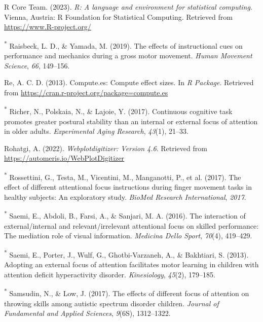 \documentclass[
  man, donotrepeattitle,floatsintext]{apa7}
\newlength{\cslhangindent}
\newlength{\cslentryspacingunit} %
\newenvironment{CSLReferences}[2] %
 {%
  \setlength{\parindent}{0pt}
  \ifodd #1
  \let\oldpar\par
  \def\par{\hangindent=\cslhangindent\oldpar}
  \fi
  \setlength{\parskip}{#2\cslentryspacingunit}
 }%
 {}
\begin{document}
\begin{CSLReferences}{1}{0}
\leavevmode{}%
R Core Team. (2023). \emph{R: A language and environment for statistical computing}. Vienna, Austria: R Foundation for Statistical Computing. Retrieved from \url{https://www.R-project.org/}

\leavevmode{}%
\textsuperscript{*} Raisbeck, L. D., \& Yamada, M. (2019). The effects of instructional cues on performance and mechanics during a gross motor movement. \emph{Human Movement Science}, \emph{66}, 149--156.

\leavevmode{}%
Re, A. C. D. (2013). Compute.es: Compute effect sizes. In \emph{R Package}. Retrieved from \url{https://cran.r-project.org/package=compute.es}

\leavevmode{}%
\textsuperscript{*} Richer, N., Polskaia, N., \& Lajoie, Y. (2017). Continuous cognitive task promotes greater postural stability than an internal or external focus of attention in older adults. \emph{Experimental Aging Research}, \emph{43}(1), 21--33.

\leavevmode{}%
Rohatgi, A. (2022). \emph{Webplotdigitizer: Version 4.6}. Retrieved from \url{https://automeris.io/WebPlotDigitizer}

\leavevmode{}%
\textsuperscript{*} Rossettini, G., Testa, M., Vicentini, M., Manganotti, P., et al. (2017). The effect of different attentional focus instructions during finger movement tasks in healthy subjects: An exploratory study. \emph{BioMed Research International}, \emph{2017}.

\leavevmode{}%
\textsuperscript{*} Saemi, E., Abdoli, B., Farsi, A., \& Sanjari, M. A. (2016). The interaction of external/internal and relevant/irrelevant attentional focus on skilled performance: The mediation role of visual information. \emph{Medicina Dello Sport}, \emph{70}(4), 419--429.

\leavevmode{}%
\textsuperscript{*} Saemi, E., Porter, J., Wulf, G., Ghotbi-Varzaneh, A., \& Bakhtiari, S. (2013). Adopting an external focus of attention facilitates motor learning in children with attention deficit hyperactivity disorder. \emph{Kinesiology}, \emph{45}(2), 179--185.

\leavevmode{}%
\textsuperscript{*} Samsudin, N., \& Low, J. (2017). The effects of different focus of attention on throwing skills among autistic spectrum disorder children. \emph{Journal of Fundamental and Applied Sciences}, \emph{9}(6S), 1312--1322.


\end{CSLReferences}
\end{document}
